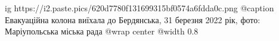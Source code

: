  
 
 
 
 

\ifcmt
  ig https://i2.paste.pics/620d7780f131699315bf0574a6fdda0c.png
	@caption Евакуаційна колона виїхала до Бердянська, 31 березня 2022 рік, фото: Маріупольська міська рада
  @wrap center
  @width 0.8
\fi
